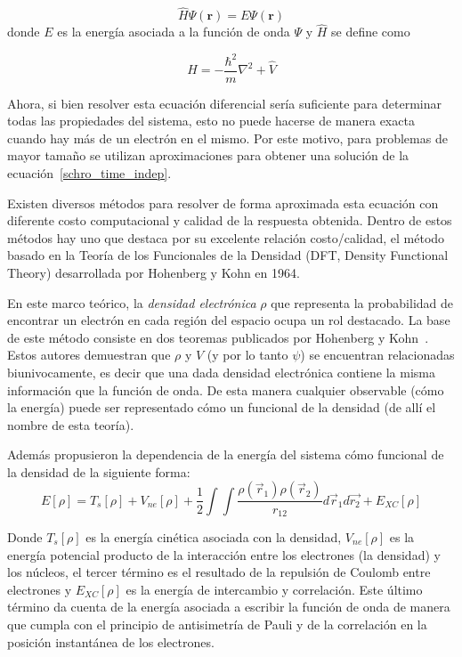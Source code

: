\begin{equation}
    \label{schro_time_indep}
    \hat{H} \Psi(\mathbf{r}) = E \Psi(\mathbf{r})
\end{equation}
donde $E$ es la energ\'ia asociada a la funci\'on de onda $\Psi$ y $\hat{H}$ se define como

\begin{equation*}
    \hat{H} =  -\frac{\hbar^2}{m} \nabla^2 + \hat{V}
\end{equation*}


Ahora, si bien resolver esta ecuaci\'on diferencial ser\'ia suficiente para determinar todas las propiedades del sistema, esto no puede hacerse de
manera exacta cuando hay m\'as de un electr\'on en el mismo. Por este motivo, para problemas de mayor tama\~no se utilizan aproximaciones
para obtener una soluci\'on de la ecuaci\'on~\ref{schro_time_indep}.

Existen diversos m\'etodos para resolver de forma aproximada esta ecuaci\'on con diferente costo computacional y calidad de la respuesta obtenida.
Dentro de estos m\'etodos hay uno que destaca por su excelente relaci\'on costo/calidad, el m\'etodo basado en la Teor\'ia de los Funcionales de la Densidad (DFT, Density Functional Theory) desarrollada por Hohenberg y Kohn en 1964.

En este marco te\'orico, la \textit{densidad electr\'onica} $\rho$ que representa la probabilidad de encontrar un electr\'on en cada regi\'on del espacio ocupa un rol destacado.
La base de este m\'etodo consiste en dos teoremas publicados por Hohenberg y Kohn~\cite{HohenbergKohn}.
Estos autores demuestran que $\rho$ y $V$ (y por lo tanto $\psi$) se encuentran relacionadas biunivocamente,
es decir que una dada densidad electr\'onica contiene la misma informaci\'on que la funci\'on de onda.
De esta manera cualquier observable (c\'omo la energ\'ia) puede ser representado c\'omo un funcional de la densidad (de all\'i el nombre de esta teor\'ia).

Adem\'as propusieron la dependencia de la energ\'ia del sistema c\'omo funcional de la densidad de la siguiente forma:
\begin{equation}
    \label{hohenberg_kohn_energy}
    E[\rho] = T_s[\rho] + V_{ne}[\rho] + \frac{1}{2} \int \int \frac{\rho(\vec{r}_1) \rho(\vec{r}_2)}{r_{12}} d\vec{r}_1 d\vec{r_2} + E_{XC}[\rho]
\end{equation}

Donde $T_s[\rho]$ es la energ\'ia cin\'etica asociada con la densidad, $V_{ne}[\rho]$ es la energ\'ia potencial producto de la interacci\'on entre los electrones (la densidad) y los n\'ucleos, el tercer t\'ermino es el resultado de la repulsi\'on de Coulomb entre electrones y $E_{XC}[\rho]$ es la energ\'ia de intercambio y correlaci\'on.
Este \'ultimo t\'ermino da cuenta de la energ\'ia asociada a escribir la funci\'on de onda de manera que cumpla con el principio de antisimetr\'ia de Pauli y de la correlaci\'on en la posici\'on instant\'anea de los electrones.

